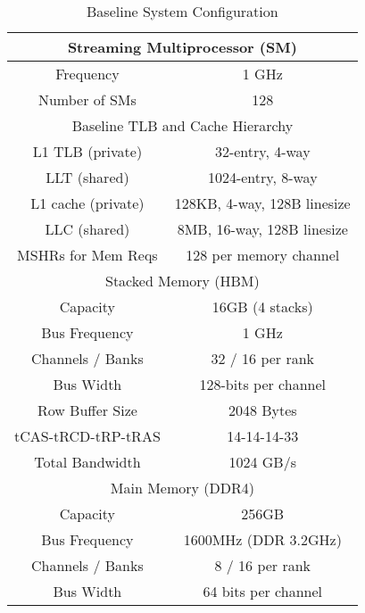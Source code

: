 \begin {table}[h]
\begin{center} 
\vspace{-0.1in}
\caption{Baseline System Configuration}
\vspace{-0. in}
\begin{tabular}{|c|c|}
\hline
     \multicolumn{2}{|c|}{Streaming Multiprocessor (SM)}               \\ \hline
     Frequency            &  1 GHz                                    \\ 
     Number of SMs        &  128                                        \\ \hline
     \multicolumn{2}{|c|}{Baseline TLB and Cache Hierarchy}            \\ \hline
     L1 TLB   (private)   &  32-entry, 4-way                \\ 
     LLT      (shared)    &  1024-entry, 8-way            \\ \hline
     L1 cache (private)   &  128KB,  4-way, 128B linesize  \\ 
     LLC      (shared)    &  8MB, 16-way, 128B linesize \\
     MSHRs for Mem Reqs   &  128 per memory channel  \\ \hline
     \multicolumn{2}{|c|}{Stacked Memory (HBM)}            \\ \hline
     Capacity             &  16GB (4 stacks)          \\
     Bus Frequency        &  1 GHz     \\ 
     Channels / Banks    &  32  / 16 per rank        \\
     Bus Width            &  128-bits per channel    \\ 
     Row Buffer Size      &  2048 Bytes              \\
     \small{tCAS-tRCD-tRP-tRAS}   &  14-14-14-33     \\ 
     Total Bandwidth      &  1024 GB/s              \\ \hline
     \multicolumn{2}{|c|}{Main Memory (DDR4)}               \\ \hline
     Capacity             &  256GB                   \\
     Bus Frequency        &  1600MHz (DDR 3.2GHz)    \\ 
     Channels / Banks    &  8  / 16 per rank        \\
     Bus Width            &  64 bits per channel     \\ 

\end{tabular}
\end{center}
\end{table}
